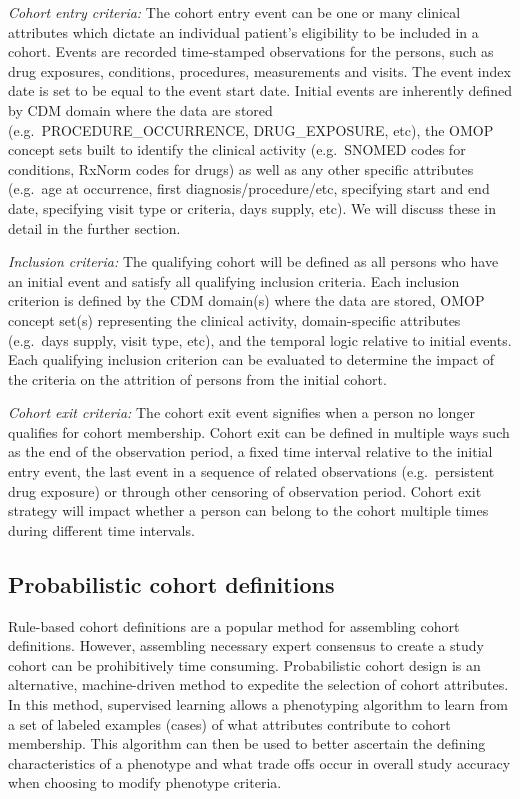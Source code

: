 \documentclass[11pt]{book}
\theoremstyle{definition}
\theoremstyle{definition}
\theoremstyle{definition}
\theoremstyle{remark}
\begin{document}
\emph{Cohort entry criteria:} The cohort entry event can be one or many clinical attributes which dictate an individual patient's eligibility to be included in a cohort. Events are recorded time-stamped observations for the persons, such as drug exposures, conditions, procedures, measurements and visits. The event index date is set to be equal to the event start date. Initial events are inherently defined by CDM domain where the data are stored (e.g.~PROCEDURE\_OCCURRENCE, DRUG\_EXPOSURE, etc), the OMOP concept sets built to identify the clinical activity (e.g.~SNOMED codes for conditions, RxNorm codes for drugs) as well as any other specific attributes (e.g.~age at occurrence, first diagnosis/procedure/etc, specifying start and end date, specifying visit type or criteria, days supply, etc). We will discuss these in detail in the further section. 

\emph{Inclusion criteria:} The qualifying cohort will be defined as all persons who have an initial event and satisfy all qualifying inclusion criteria. Each inclusion criterion is defined by the CDM domain(s) where the data are stored, OMOP concept set(s) representing the clinical activity, domain-specific attributes (e.g.~days supply, visit type, etc), and the temporal logic relative to initial events. Each qualifying inclusion criterion can be evaluated to determine the impact of the criteria on the attrition of persons from the initial cohort.

\emph{Cohort exit criteria:} The cohort exit event signifies when a person no longer qualifies for cohort membership. Cohort exit can be defined in multiple ways such as the end of the observation period, a fixed time interval relative to the initial entry event, the last event in a sequence of related observations (e.g.~persistent drug exposure) or through other censoring of observation period. Cohort exit strategy will impact whether a person can belong to the cohort multiple times during different time intervals.

\hypertarget{probabilistic-cohort-definitions}{%
\subsection{Probabilistic cohort definitions}\label{probabilistic-cohort-definitions}}

Rule-based cohort definitions are a popular method for assembling cohort definitions. However, assembling necessary expert consensus to create a study cohort can be prohibitively time consuming. Probabilistic cohort design is an alternative, machine-driven method to expedite the selection of cohort attributes. In this method, supervised learning allows a phenotyping algorithm to learn from a set of labeled examples (cases) of what attributes contribute to cohort membership. This algorithm can then be used to better ascertain the defining characteristics of a phenotype and what trade offs occur in overall study accuracy when choosing to modify phenotype criteria. 
\end{document}
